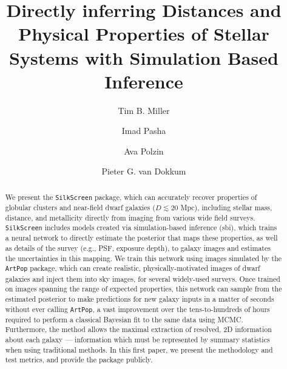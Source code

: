 \documentclass[twocolumn]{aastex631}
\newcommand{\code}[0]{\texttt{SilkScreen}}
\newcommand{\artpop}[0]{\texttt{ArtPop}}
\begin{document}
\title{Directly inferring Distances and Physical Properties of Stellar Systems with Simulation Based Inference}

\author[0000-0001-8367-6265]{Tim B. Miller}

\author{Imad Pasha}

\author[0000-0002-5283-933X]{Ava Polzin}

\author{Pieter G. van Dokkum}


\begin{abstract}
We present the \code{} package, which can accurately recover properties of globular clusters and near-field dwarf galaxies ($D\lesssim 20$ Mpc), including stellar mass, distance, and metallicity directly from imaging from various wide field surveys. \code{} includes models created via simulation-based inference (sbi), which trains a neural network to directly estimate the posterior that maps these properties, as well as details of the survey (e.g., PSF, exposure depth), to galaxy images and estimates the uncertainties in this mapping. We train this network using images simulated by the \artpop{} package, which can create realistic, physically-motivated images of dwarf galaxies and inject them into sky images, for several widely-used surveys. Once trained on images spanning the range of expected properties, this network can sample from the estimated posterior to make predictions for new galaxy inputs in a matter of seconds without ever calling \artpop{}, a vast improvement over the tens-to-hundreds of hours required to perform a classical Bayesian fit to the same data using MCMC. Furthermore, the method allows the maximal extraction of resolved, 2D information about each galaxy --- information which must be represented by summary statistics when using traditional methods. In this first paper, we present the methodology and test metrics, and provide the package publicly. 

\end{abstract}
\end{document}
